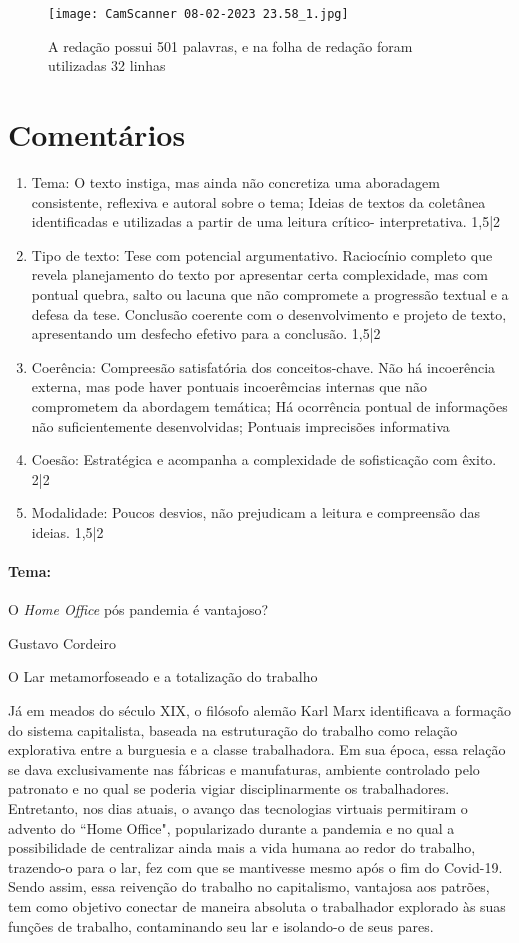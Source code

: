 \documentclass{article}
\begin{document}
\newpage
\begin{figure}
\centering
\texttt{[image: CamScanner 08-02-2023 23.58\_1.jpg]}
\caption{\label{}A redação possui 501 palavras, e na folha de redação foram utilizadas 32 linhas}
\end{figure}
\section*{Comentários}
\begin{enumerate}
\item Tema: O texto instiga, mas ainda não concretiza uma aboradagem consistente, reflexiva e autoral sobre o tema; Ideias de textos da coletânea identificadas e utilizadas a partir de uma leitura crítico- interpretativa. 1,5|2
\item Tipo de texto: Tese com potencial argumentativo. Raciocínio completo que revela planejamento do texto por apresentar certa complexidade, mas com pontual quebra, salto ou lacuna que não compromete a progressão textual e a defesa da tese. Conclusão coerente com o desenvolvimento e projeto de texto, apresentando um desfecho efetivo para a conclusão. 1,5|2
\item Coerência: Compreesão satisfatória dos conceitos-chave. Não há incoerência externa, mas pode haver pontuais incoerêmcias internas que não comprometem da abordagem temática; Há ocorrência pontual de informações não suficientemente desenvolvidas; Pontuais imprecisões informativa
\item Coesão: Estratégica e acompanha a complexidade de sofisticação com êxito. 2|2
\item Modalidade: Poucos desvios, não prejudicam a leitura e compreensão das ideias. 1,5|2
\end{enumerate}

\newpage
\paragraph{Tema:} O \textit{Home Office} pós pandemia é vantajoso? 

\begin{flushright} Gustavo Cordeiro \end{flushright}
O Lar metamorfoseado e a totalização do trabalho

Já em meados do século XIX, o filósofo alemão Karl Marx identificava a formação do sistema capitalista, baseada na estruturação do trabalho como relação explorativa entre a burguesia e a classe trabalhadora. Em sua época, essa relação se dava exclusivamente nas fábricas e manufaturas, ambiente controlado pelo patronato e no qual se poderia vigiar disciplinarmente os trabalhadores. Entretanto, nos dias atuais, o avanço das tecnologias virtuais permitiram o advento do “Home Office", popularizado durante a pandemia e no qual a possibilidade de centralizar ainda mais a vida humana ao redor do trabalho, trazendo-o para o lar, fez com que se mantivesse mesmo após o fim do Covid-19. Sendo assim, essa reivenção do trabalho no capitalismo, vantajosa aos patrões, tem como objetivo conectar de maneira absoluta o trabalhador explorado às suas funções de trabalho, contaminando seu lar e isolando-o de seus pares.
\end{document}
